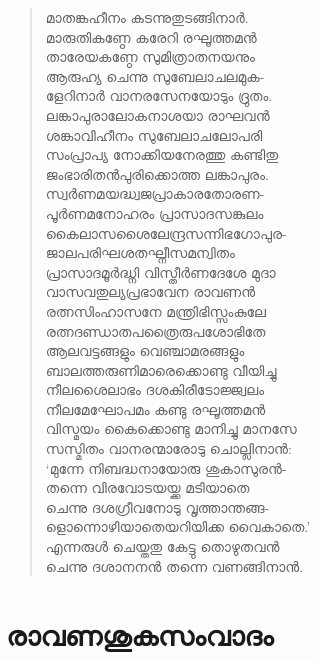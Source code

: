 \begin{verse}
മാതങ്കഹീനം കടന്നുതുടങ്ങിനാര്‍.\\
മാരുതികണ്ഠേ കരേറി രഘൂത്തമന്‍\\
താരേയകണ്ഠേ സുമിത്രാതനയനും\\
ആരുഹ്യ ചെന്നു സുബേലാചലമുക-\\
ളേറിനാര്‍ വാനരസേനയോടും ദ്രുതം.\\
ലങ്കാപുരാലോകനാശയാ രാഘവന്‍\\
ശങ്കാവിഹീനം സുബേലാചലോപരി\\
സംപ്രാപ്യ നോക്കിയനേരത്തു കണ്ടിതു\\
ജംഭാരിതന്‍പുരിക്കൊത്ത ലങ്കാപുരം.\\
സ്വര്‍ണമയദ്ധ്വജപ്രാകാരതോരണ-\\
പൂര്‍ണമനോഹരം പ്രാസാദസങ്കുലം\\
കൈലാസശൈലേന്ദ്രസന്നിഭഗോപുര-\\
ജാലപരിഘശതഘ്നീസമന്വിതം\\
പ്രാസാദമൂര്‍ദ്ധ്നി വിസ്തീര്‍ണദേശേ മുദാ\\
വാസവതുല്യപ്രഭാവേന രാവണന്‍\\
രത്നസിംഹാസനേ മന്ത്രിഭിസ്സംകുലേ\\
രത്നദണ്ഡാതപത്രൈരുപശോഭിതേ\\
ആലവട്ടങ്ങളും വെഞ്ചാമരങ്ങളും\\
ബാലത്തരുണിമാരെക്കൊണ്ടു വീയിച്ചു\\
നീലശൈലാഭം ദശകിരീടോജ്ജ്വലം\\
നീലമേഘോപമം കണ്ടു രഘൂത്തമന്‍\\
വിസ്മയം കൈക്കൊണ്ടു മാനിച്ചു മാനസേ\\
സസ്മിതം വാനരന്മാരോടു ചൊല്ലിനാന്‍:\\
‘മുന്നേ നിബദ്ധനായോരു ശുകാസുരന്‍-\\
തന്നെ വിരവോടയയ്ക്ക മടിയാതെ\\
ചെന്നു ദശഗ്രീവനോടു വൃത്താന്തങ്ങ-\\
ളൊന്നൊഴിയാതെയറിയിക്ക വൈകാതെ.’\\
എന്നരുള്‍ ചെയ്തതു കേട്ടു തൊഴുതവന്‍\\
ചെന്നു ദശാനനന്‍ തന്നെ വണങ്ങിനാന്‍.
\end{verse}


\section{രാവണശുകസംവാദം}

